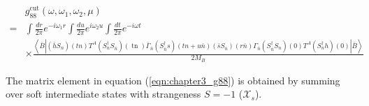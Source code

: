 \begin{align}\label{eqn:chapter3_g88}
&g_{88}^{\mathrm{cut}}\left(\omega, \omega_{1}, \omega_{2}, \mu\right)\nonumber\\
=& \int \frac{d r}{2 \pi} e^{-i \omega_{1} r} \int \frac{d u}{2 \pi} e^{i \omega_{2} u} \int \frac{d t}{2 \pi} e^{-i \omega t}\nonumber \\
& \times \frac{\left\langle\bar{B}\left|\left(\bar{h} S_{n}\right)(t n) T^{A}\left(S_{n}^{\dagger} S_{\bar{n}}\right)(\operatorname{tn}) \bar{\Gamma}_{\bar{n}}\left(S_{\bar{n}}^{\dagger} s\right)(t n+u \bar{n})\left(\bar{s} S_{\bar{n}}\right)(r \bar{n}) \Gamma_{\bar{n}}\left(S_{\bar{n}}^{\dagger} S_{n}\right)(0) T^{A}\left(S_{n}^{\dagger} h\right)(0)\right| \bar{B}\right\rangle}{2 M_{B}}
\end{align}

The matrix element in equation (\ref{eqn:chapter3_g88}) is obtained by summing over soft intermediate states with strangeness $S=-1$ ($\mathcal{X}_{s}$).
